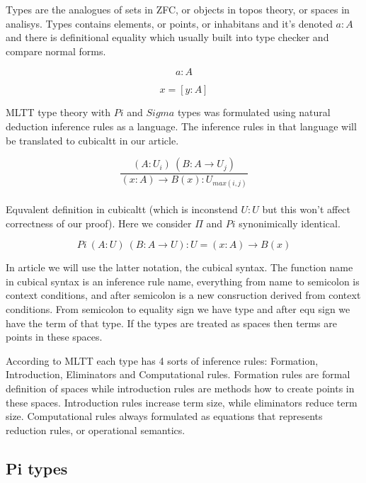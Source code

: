\documentclass{article}
\begin{document}
Types are the analogues of sets in ZFC, or objects in topos theory, or spaces in analisys.
Types contains elements, or points, or inhabitans and it's denoted $a : A$ and there
is definitional equality which usually built into type checker and compare normal forms.

\begin{equation}
\tag{terms and types}
a : A
\end{equation}

\begin{equation}
\tag{definitional equality}
x = [ y : A ]
\end{equation}

MLTT type theory with $Pi$ and $Sigma$ types was formulated using
natural deduction inference rules as a language.
The inference rules in that language will
be translated to cubicaltt in our article.

\begin{equation}
\tag{natural deduction}
\dfrac
{(A: U_i)\ (B: A \rightarrow U_j)}
{(x: A) \rightarrow B(x): U_{max(i,j)}}
\end{equation}
\\
Equvalent definition in cubicaltt (which is inconstend $U : U$ but
this won't affect correctness of our proof). Here we consider $\Pi$
and $Pi$ synonimically identical. 

\begin{equation}
\tag{cubicaltt}
Pi\ (A: U)\ (B: A \rightarrow U): U = (x: A) \rightarrow B(x)
\end{equation}

In article we will use the latter notation, the cubical syntax.
The function name in cubical syntax is an inference rule name,
everything from name to semicolon is context conditions,
and after semicolon is a new consruction derived from context conditions.
From semicolon to equality sign we have type and after
equ sign we have the term of that type.
If the types are treated as spaces then terms are points in these spaces.

According to MLTT each type has 4 sorts of inference rules:
Formation, Introduction, Eliminators and Computational rules.
Formation rules are formal definition of spaces while introduction rules
are methods how to create points in these spaces. Introduction rules increase term size,
while eliminators reduce term size. Computational rules always
formulated as equations that represents reduction rules,
or operational semantics.

\subsection{Pi types}
\end{document}
